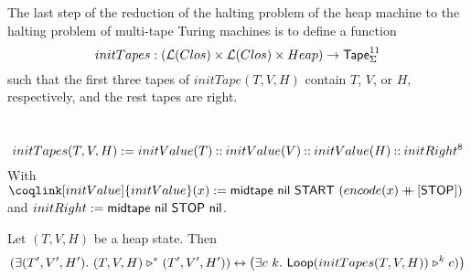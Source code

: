 The last step of the reduction of the halting problem of the heap machine to the halting problem of multi-tape Turing machines is to define a function
\[
  initTapes : \left(\mathcal{L}(Clos) \times \mathcal{L}(Clos) \times Heap\right) \rightarrow \mathsf{Tape}_\Sigma^{11}
\]
such that the first three tapes of $initTape(T,V,H)$ contain $T$, $V$, or $H$, respectively, and the rest tapes are right.

\begin{definition}[$initTapes$][initTapes]
  \label{def:initTapes}
  ~
  \[
    initTapes(T,V,H) := initValue(T) \mathbin{::} initValue(V) \mathbin{::} initValue(H) \mathbin{::} initRight^8
  \]
  With $\coqlink[initValue]{initValue}(x) := \MS{midtape}~\nil~\MS{START}~(encode(x) \app [\MS{STOP}])$ and $initRight := \mathsf{midtape}~\mathsf{nil}~\mathsf{STOP}~\mathsf{nil}$.
\end{definition}

\begin{theorem}
  \label{lem:HaltingProblem}
  Let $(T,V,H)$ be a heap state.  Then
  \[
    \left(\exists (T',V',H').~(T,V,H) \mathrel{\triangleright}^* (T',V',H') \right) \mathbin{\leftrightarrow} \left(\exists c~k.~\mathsf{Loop}(initTapes(T,V,H)) \mathrel{\triangleright}^k c)\right)
  \]
\end{theorem}







